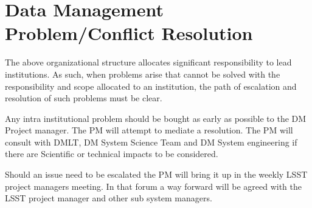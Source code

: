 \section{Data Management Problem/Conflict Resolution }
The above organizational structure allocates significant responsibility to lead institutions.  As such, when problems arise that cannot be solved with the responsibility and scope allocated to an institution, the path of escalation and resolution of such problems must be clear.

Any intra institutional problem should be bought as early as possible to the DM Project manager. The PM will attempt to mediate a resolution. The PM will consult with DMLT, DM System Science Team and DM System engineering if there are Scientific or technical impacts to be considered.

Should an issue need to be escalated the PM will bring it up in the weekly LSST project managers meeting.
In that forum a way forward will be agreed with the LSST project manager and other sub system managers.




